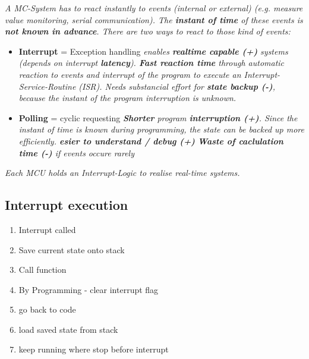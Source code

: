 \textit{
    A MC-System has to react instantly to events (internal or external)
    (e.g. measure value monitoring, serial communication).\newline
    The \textbf{instant of time} of these events is \textbf{not known in advance}. \newline
    There are two ways to react to those kind of events: \newline
}

\begin{itemize}
    \item{
        \textbf{Interrupt} = Exception handling \newline
        \textit{
            enables \textbf{realtime capable (+)} systems (depends on interrupt
            \textbf{latency}). \textbf{Fast reaction time} through automatic reaction
            to events and interrupt of the program to execute an
            Interrupt-Service-Routine (ISR). \newline
            Needs substancial effort for \textbf{state backup (-)}, because the instant of
            the program interruption is unknown.
        }
    }
    \item {
        \textbf{Polling} = cyclic requesting \newline
        \textit{
            \textbf{Shorter} program \textbf{interruption (+)}. Since the instant of time is
            known during programming, the state can be backed up more efficiently. \newline
            \textbf{esier to understand / debug (+)} \newline
            \textbf{Waste of caclulation time (-)} if events occure rarely
        }
    }
\end{itemize}

\textit{
    \newline
    Each MCU holds an Interrupt-Logic to realise real-time systems.
}

\subsection{Interrupt execution}

\begin{enumerate}
    \item{Interrupt called}
    \item{Save current state onto stack}
    \item{Call function}
    \item{By Programming - clear interrupt flag}
    \item{go back to code}
    \item{load saved state from stack}
    \item{keep running where stop before interrupt}
\end{enumerate}

